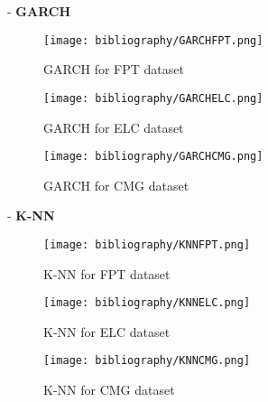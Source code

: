 \documentclass{ieeeojies}
\begin{document}
- \textbf{GARCH}\\
\begin{figure}[H]
  \centering
  \begin{minipage}{0.8\linewidth}
    \centering
    \texttt{[image: bibliography/GARCHFPT.png]}
    \caption{GARCH for FPT dataset}
    \label{fig:}
  \end{minipage}
\end{figure}
\begin{figure}[H]
  \centering
  \begin{minipage}{0.8\linewidth}
    \centering
    \texttt{[image: bibliography/GARCHELC.png]}
        \caption{GARCH for ELC dataset}
    \label{fig:}
  \end{minipage}
\end{figure}
\begin{figure}[H]
  \centering
  \begin{minipage}{0.8\linewidth}
    \centering
    \texttt{[image: bibliography/GARCHCMG.png]}
        \caption{GARCH for CMG dataset}
    \label{fig:}
  \end{minipage}
\end{figure}

- \textbf{K-NN}\\
\begin{figure}[H]
  \centering
  \begin{minipage}{0.8\linewidth}
    \centering
    \texttt{[image: bibliography/KNNFPT.png]}
    \caption{K-NN for FPT dataset}
    \label{fig:}
  \end{minipage}
\end{figure}
\begin{figure}[H]
  \centering
  \begin{minipage}{0.8\linewidth}
    \centering
    \texttt{[image: bibliography/KNNELC.png]}
    \caption{K-NN for ELC dataset}
    \label{fig:}
  \end{minipage}
\end{figure}
\begin{figure}[H]
  \centering
  \begin{minipage}{0.8\linewidth}
    \centering
    \texttt{[image: bibliography/KNNCMG.png]}
    \caption{K-NN for CMG dataset}
    \label{fig:}
  \end{minipage}
\end{figure}
\end{document}
